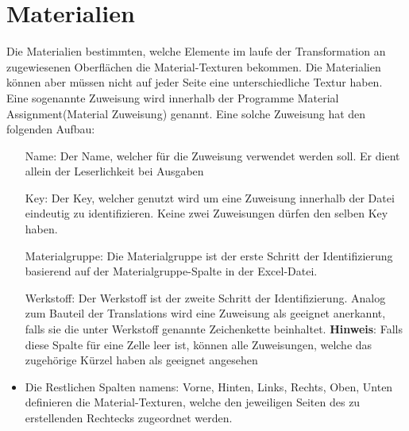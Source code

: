 \documentclass{book}
\newcommand{\hinweis}[1]{\newline \textbf{Hinweis}: #1 \newline}
\begin{document}
		\section{Materialien}\label{Material}
			Die Materialien bestimmten, welche Elemente im laufe der Transformation an zugewiesenen Oberflächen die Material-Texturen bekommen. Die Materialien können aber müssen nicht auf jeder Seite eine unterschiedliche Textur haben. Eine sogenannte Zuweisung wird innerhalb der Programme \glqq Material Assignment\grqq (Material Zuweisung) genannt. Eine solche Zuweisung hat den folgenden Aufbau:
				\begin{itemize}
					\setlength{\itemindent}{1cm}
					\item[Name:] Der Name, welcher für die Zuweisung verwendet werden soll. Er dient allein der Leserlichkeit bei Ausgaben
					\item[Key:] Der Key, welcher genutzt wird um eine Zuweisung innerhalb der Datei eindeutig zu identifizieren. Keine zwei Zuweisungen dürfen den selben Key haben.					
					\item[Materialgruppe:] Die Materialgruppe ist der erste Schritt der Identifizierung basierend auf der \glqq Materialgruppe\grqq-Spalte in der Excel-Datei. 
					\item[Werkstoff:] Der Werkstoff ist der zweite Schritt der Identifizierung. Analog zum Bauteil der Translations wird eine Zuweisung als geeignet anerkannt, falls sie die unter Werkstoff genannte Zeichenkette beinhaltet.
					\hinweis{Falls diese Spalte für eine Zelle leer ist, können alle Zuweisungen, welche das zugehörige Kürzel haben als geeignet angesehen}
					\item Die Restlichen Spalten namens: Vorne, Hinten, Links, Rechts, Oben, Unten definieren die Material-Texturen, welche den jeweiligen Seiten des zu erstellenden Rechtecks zugeordnet werden.
				\end{itemize}
			
\end{document}
